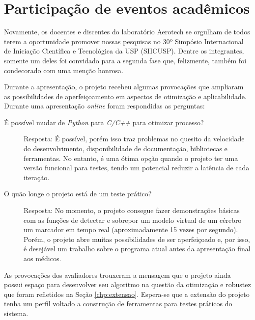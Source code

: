 \chapter{Participação de eventos acadêmicos}\label{chp:eventos}

Novamente, os docentes e discentes do laboratório Aerotech se orgulham de todos terem a oportunidade promover nossas pesquisas no 30º Simpósio Internacional de Iniciação Científica e Tecnológica da USP (SIICUSP). Dentre os integrantes, somente um deles foi convidado para a segunda fase que, felizmente, também foi condecorado com uma menção honrosa.

Durante a apresentação, o projeto recebeu algumas provocações que ampliaram as possibilidades de aperfeiçoamento em aspectos de otimização e aplicabilidade. Durante uma apresentação \textit{online} foram respondidas as perguntas:

\begin{description}
    \item[É possível mudar de \textit{Python} para \textit{C/C++} para otimizar processo?] Resposta: É possível, porém isso traz problemas no quesito da velocidade do desenvolvimento, disponibilidade de documentação, bibliotecas e ferramentas. No entanto, é uma ótima opção quando o projeto ter uma versão funcional para testes, tendo um potencial reduzir a latência de cada iteração.
    \item[O quão longe o projeto está de um teste prático?] Resposta: No momento, o projeto consegue fazer demonstrações básicas com as funções de detectar e sobrepor um modelo virtual de um cérebro um marcador em tempo real (aproximadamente 15 vezes por segundo). Porém, o projeto abre muitas possibilidades de ser aperfeiçoado e, por isso, é desejável um trabalho sobre o programa atual antes da apresentação final aos médicos.
\end{description}

As provocações dos avaliadores trouxeram a mensagem que o projeto ainda possui espaço para desenvolver seu algoritmo na questão da otimização e robustez que foram refletidos na Seção \ref{chp:extensao}. Espera-se que a extensão do projeto tenha um perfil voltado a construção de ferramentas para testes práticos do sistema.